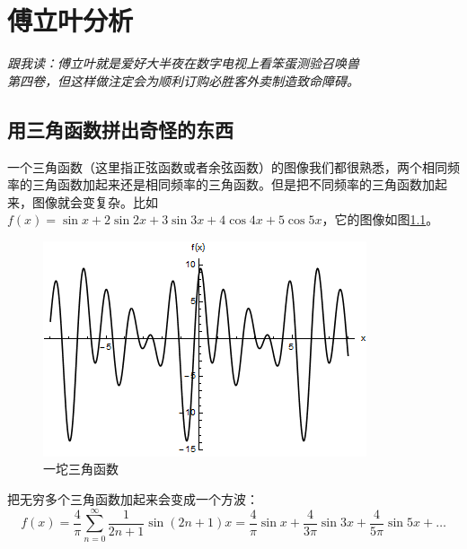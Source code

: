 \chapter{傅立叶分析}
\begin{flushright} \it 跟我读：傅立叶就是爱好大半夜在数字电视上看笨蛋测验召唤兽 \\ 第四卷，但这样做注定会为顺利订购必胜客外卖制造致命障碍。 \end{flushright}
\section{用三角函数拼出奇怪的东西}
一个三角函数（这里指正弦函数或者余弦函数）的图像我们都很熟悉，两个相同频率的三角函数加起来还是相同频率的三角函数。但是把不同频率的三角函数加起来，图像就会变复杂。比如$f(x)=\sin x+2 \sin 2 x+3 \sin 3 x+4 \cos 4 x+5 \cos 5 x$，它的图像如图\ref{fig-trigo-sum}。
\begin{figure}[htb]
\centering
\includegraphics[scale=0.5]{fig/trigo-sum.png}
\caption{一坨三角函数}
\label{fig-trigo-sum}
\end{figure}

把无穷多个三角函数加起来会变成一个方波：
\begin{equation*}
f(x)=\frac{4}{\pi} \sum_{n=0}^{\infty} \frac{1}{2 n+1} \sin (2 n+1) x=\frac{4}{\pi} \sin x+\frac{4}{3 \pi} \sin 3 x+\frac{4}{5 \pi} \sin 5 x+\dots
\end{equation*}

